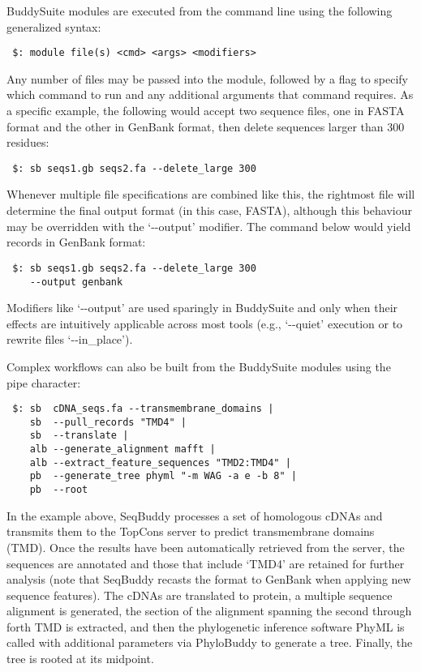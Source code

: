 \documentclass[nogrid]{MBE}%
\begin{document}
BuddySuite modules are executed from the command line using the following generalized syntax:

\smallskip

{\small
\begin{verbatim}
 $: module file(s) <cmd> <args> <modifiers>
\end{verbatim}
}
\smallskip

Any number of files may be passed into the module, followed by a flag to specify which command to run and any additional arguments that command requires. As a specific example, the following would accept two sequence files, one in FASTA format and the other in GenBank format, then delete sequences larger than 300 residues:

\smallskip

{\small
\begin{verbatim}
 $: sb seqs1.gb seqs2.fa --delete_large 300
\end{verbatim}
}
\smallskip

Whenever multiple file specifications are combined like this, the rightmost file will determine the final output format (in this case, FASTA), although this behaviour may be overridden with the `-{}-output' modifier. The command below would yield records in GenBank format:

\smallskip

{\small
\begin{verbatim}
 $: sb seqs1.gb seqs2.fa --delete_large 300
    --output genbank
\end{verbatim}
}
\smallskip

Modifiers like \mbox{`-{}-output'} are used sparingly in BuddySuite and only when their effects are intuitively applicable across most tools (e.g., \mbox{`-{}-quiet'} execution or to rewrite files \mbox{`-{}-in\_place'}).

Complex workflows can also be built from the BuddySuite modules using the pipe character:

\smallskip
{\small
\begin{verbatim}
 $: sb  cDNA_seqs.fa --transmembrane_domains |
    sb  --pull_records "TMD4" |
    sb  --translate |
    alb --generate_alignment mafft |
    alb --extract_feature_sequences "TMD2:TMD4" |
    pb  --generate_tree phyml "-m WAG -a e -b 8" |
    pb  --root
\end{verbatim}
}

\smallskip

In the example above, SeqBuddy processes a set of homologous cDNAs and transmits them to the TopCons server \cite{Tsirigos:2015eo} to predict transmembrane domains (TMD). Once the results have been automatically retrieved from the server, the sequences are annotated and those that include `TMD4' are retained for further analysis (note that SeqBuddy recasts the format to GenBank when applying new sequence features). The cDNAs are translated to protein, a multiple sequence alignment is generated, the section of the alignment spanning the second through forth TMD is extracted, and then the phylogenetic inference software PhyML \cite{Guindon:2010gf} is called with additional parameters via PhyloBuddy to generate a tree. Finally, the tree is rooted at its midpoint.
\end{document}

